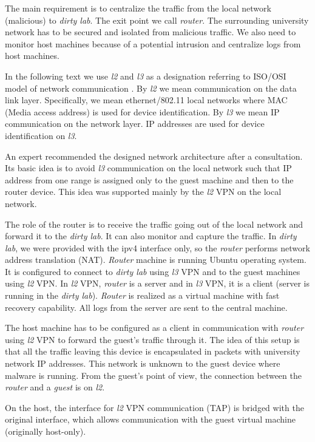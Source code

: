 The main requirement is to centralize the traffic from the local network (malicious) to \emph{dirty lab}. The exit point we call \emph{router}. The surrounding university network has to be secured and isolated from malicious traffic. We also need to monitor host machines because of a potential intrusion and centralize logs from host machines.

In the following text we use \emph{l2} and \emph{l3} as a designation referring to ISO/OSI model of network communication \cite{Zimmermann1980}. By \emph{l2} we mean communication on the data link layer. Specifically, we mean ethernet/802.11 local networks where MAC (Media access address) is used for device identification. By \emph{l3} we mean IP communication on the network layer. IP addresses are used for device identification on \emph{l3}.

An expert recommended the designed network architecture after a consultation. Its basic idea is to avoid \emph{l3} communication on the local network such that IP address from one range is assigned only to the guest machine and then to the router device. This idea was supported mainly by the \emph{l2} VPN on the local network.

The role of the router is to receive the traffic going out of the local network and forward it to the \emph{dirty lab}. It can also monitor and capture the traffic. In \emph{dirty lab}, we were provided with the ipv4 interface only, so the \emph{router} performs network address translation (NAT). \emph{Router} machine is running Ubuntu operating system. It is configured to connect to \emph{dirty lab} using \emph{l3} VPN and to the guest machines using \emph{l2} VPN. In \emph{l2} VPN, \emph{router} is a server and in \emph{l3} VPN, it is a client (server is running in the \emph{dirty lab}). \emph{Router} is realized as a virtual machine with fast recovery capability. All logs from the server are sent to the central machine.

The host machine has to be configured as a client in communication with \emph{router} using \emph{l2} VPN to forward the guest's traffic through it. The idea of this setup is that all the traffic leaving this device is encapsulated in packets with university network IP addresses. This network is unknown to the guest device where malware is running. From the guest's point of view, the connection between the \emph{router} and a \emph{guest} is on \emph{l2}. 

On the host, the interface for \emph{l2} VPN communication (TAP) is bridged with the original interface, which allows communication with the guest virtual machine (originally host-only). 

